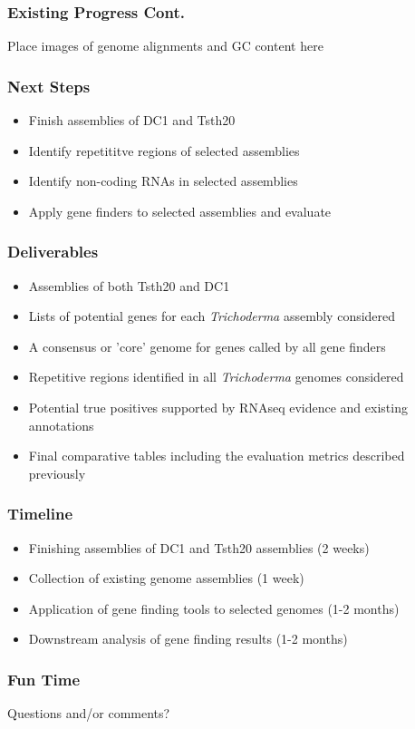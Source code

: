 \documentclass{beamer}
\begin{document}
\begin{frame}
  \frametitle{Existing Progress Cont.}
  Place images of genome alignments and GC content here
\end{frame}

\begin{frame}
  \frametitle{Next Steps}
  \begin{itemize}
  \item Finish assemblies of DC1 and Tsth20
  \item Identify repetititve regions of selected assemblies
  \item Identify non-coding RNAs in selected assemblies
  \item Apply gene finders to selected assemblies and evaluate
  \end{itemize}
\end{frame}

\begin{frame}
  \frametitle{Deliverables}
  \begin{itemize}
  \item Assemblies of both Tsth20 and DC1
  \item Lists of potential genes for each \textit{Trichoderma}
    assembly considered
  \item A consensus or 'core' genome for genes called by all gene
    finders
  \item Repetitive regions identified in all \textit{Trichoderma}
    genomes considered
  \item Potential true positives supported by RNAseq evidence and
    existing annotations
  \item Final comparative tables including the evaluation metrics
    described previously
  \end{itemize}
\end{frame}

\begin{frame}
  \frametitle{Timeline}
  \begin{itemize}
  \item Finishing assemblies of DC1 and Tsth20 assemblies (2 weeks)
  \item Collection of existing genome assemblies (1 week)
  \item Application of gene finding tools to selected genomes (1-2
    months)
  \item Downstream analysis of gene finding results (1-2 months)
  \end{itemize}
\end{frame}

\begin{frame}
  \frametitle{Fun Time}
  \begin{center}
    Questions and/or comments?
  \end{center}
\end{frame}
\end{document}
